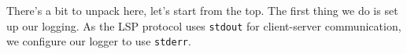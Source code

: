 There's a bit to unpack here, let's start from the top. The first thing we do is
set up our logging. As the LSP protocol uses \texttt{stdout} for client-server communication,
we configure our logger to use \texttt{stderr}.









